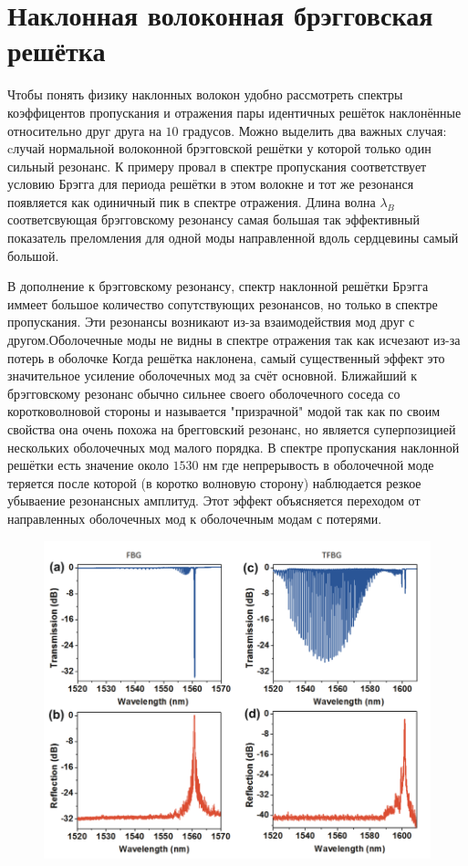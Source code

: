 \section{Наклонная волоконная брэгговская решётка}
Чтобы понять физику наклонных волокон удобно рассмотреть спектры коэффицентов 
пропускания и отражения пары идентичных решёток наклонённые относительно друг друга на $ 10 $ градусов.
Можно выделить два важных случая: cлучай нормальной волоконной брэгговской решётки у которой только один сильный резонанс. К примеру провал в спектре пропускания соответствует условию Брэгга для периода решётки в этом волокне и тот же резонанся появляется как одиничный пик в спектре отражения. Длина волна $ \lambda_{B} $ соответсвующая брэгговскому резонансу самая большая так эффективный показатель преломления для одной моды направленной вдоль сердцевины самый большой.

В дополнение к брэгговскому резонансу, спектр наклонной решётки Брэгга иммеет большое количество сопутствующих резонансов, но только в спектре пропускания. Эти резонансы возникают из-за взаимодействия мод друг с другом.Оболочечные моды не видны в спектре отражения так как исчезают из-за потерь в оболочке Когда решётка наклонена, самый существенный эффект это значительное усиление оболочечных мод за счёт основной.
Ближайший к брэгговскому резонанс обычно сильнее своего оболочечного соседа со коротковолновой стороны и называется "призрачной" модой так как по своим свойства она очень похожа на брегговский резонанс, но
является суперпозицией нескольких оболочечных мод малого порядка. В спектре пропускания наклонной решётки есть значение около $ 1530 $ нм где непрерывость в оболочечной моде теряется после которой (в коротко
волновую сторону) наблюдается резкое убываение резонансных амплитуд. Этот эффект объясняется переходом от направленных оболочечных мод к оболочечным модам с потерями.







\begin{figure}[h]
	\centering
	\includegraphics[width=0.7\linewidth]{screenshot001}
	\caption{}
	\label{fig:screenshot001}
\end{figure}


